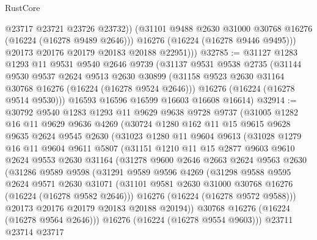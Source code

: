 \begin{lexlean}{RustCore}
\begin{coremodule}
                @23717
                @23721
                @23726
                @23732))
            (@31101 @9488 @2630 @31000 @30768 @16276 (@16224 (@16278 @9489 @2646)))
            @16276
            (@16224 (@16278 @9446 @9495)))
          @20173
          @20176
          @20179
          @20183
          @20188
          @22951)))
@32785 := @31127
    @1283
    @1293
    @11
    @9531
    @9540
    @2646
    @9739
    (@31137
      @9531
      @9538
      @2735
      (@31144
        @9530
        @9537
        @2624
        @9513
        @2630
        @30899
        (@31158 @9523 @2630 @31164 @30768 @16276 (@16224 (@16278 @9524 @2646)))
        @16276
        (@16224 (@16278 @9514 @9530)))
      @16593
      @16596
      @16599
      @16603
      @16608
      @16614)
@32914 := @30792
    @9540
    @1283
    @1293
    @11
    @9629
    @9638
    @9728
    @9737
    (@31005
      @1282
      @16
      @11
      @9629
      @9636
      @4269
      (@30724
        @1280
        @162
        @11
        @15
        @9615
        @9628
        @9635
        @2624
        @9545
        @2630
        (@31023
          @1280
          @11
          @9604
          @9613
          (@31028
            @1279
            @16
            @11
            @9604
            @9611
            @5807
            (@31151
              @1210
              @11
              @15
              @2877
              @9603
              @9610
              @2624
              @9553
              @2630
              @31164
              (@31278
                @9600
                @2646
                @2663
                @2624
                @9563
                @2630
                (@31286
                  @9589
                  @9598
                  (@31291
                    @9589
                    @9596
                    @4269
                    (@31298
                      @9588
                      @9595
                      @2624
                      @9571
                      @2630
                      @31071
                      (@31101 @9581 @2630 @31000 @30768 @16276 (@16224 (@16278 @9582 @2646)))
                      @16276
                      (@16224 (@16278 @9572 @9588)))
                    @20173
                    @20176
                    @20179
                    @20183
                    @20188
                    @20194))
                @30768
                @16276
                (@16224 (@16278 @9564 @2646)))
              @16276
              (@16224 (@16278 @9554 @9603)))
            @23711
            @23714
            @23717

\end{coremodule}
\end{lexlean}
